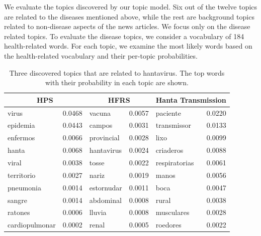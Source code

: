 \documentclass[twoside,leqno,twocolumn]{article}
\begin{document}
We evaluate the topics discovered by our topic model. Six out of the twelve topics are related to the diseases mentioned above, while the rest are background topics related to non-disease aspects of the news articles. We focus only on the disease related topics. To evaluate the disease topics, we consider a vocabulary of 184 health-related words. For each topic, we examine the most likely words based on the health-related vocabulary and their per-topic probabilities.
\begin{table}[t]
\scriptsize\centering
\caption{Three discovered topics that are related to hantavirus. The top words with their probability in each topic are shown.}
\begin{tabular}{|lr|lr|lr|}
\hline
\multicolumn{2}{|c|}{\bf HPS} & \multicolumn{2}{|c|}{\bf HFRS} &
\multicolumn{2}{|c|}{\bf Hanta Transmission} \\ \hline
virus & 0.0468 & vacuna & 0.0057 & paciente & 0.0220 \\
epidemia & 0.0443 & campos & 0.0031 & transmissor & 0.0133 \\
enfermos & 0.0066& provincial & 0.0028  & lixo &0.0099 \\
hanta & 0.0068 & hantavirus & 0.0024  & criaderos & 0.0088\\
viral & 0.0038 & tosse & 0.0022 & respiratorias & 0.0061 \\
territorio & 0.0027 & nariz & 0.0019 & manos & 0.0056 \\
pneumonia & 0.0014 & estornudar & 0.0011 & boca & 0.0047 \\
sangre & 0.0014 & abdominal & 0.0008 & rural & 0.0038 \\
ratones & 0.0006 & lluvia & 0.0008 & musculares & 0.0028 \\
cardiopulmonar & 0.0002 & renal & 0.0005 & roedores & 0.0022 \\
\hline
\end{tabular}
\label{tab:hanta_topics}
\end{table}
\end{document}
